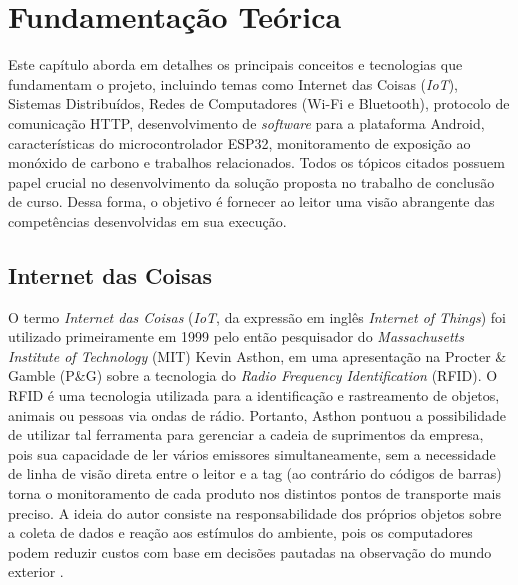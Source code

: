 \chapter{Fundamentação Teórica}

Este capítulo aborda em detalhes os principais conceitos e tecnologias que fundamentam o projeto, incluindo temas como Internet das Coisas (\textit{IoT}), Sistemas Distribuídos, 
Redes de Computadores (Wi-Fi e Bluetooth), protocolo de comunicação HTTP, desenvolvimento de \textit{software} para a plataforma Android, características do microcontrolador ESP32, monitoramento de 
exposição ao monóxido de carbono e trabalhos relacionados. Todos os tópicos citados possuem papel crucial no desenvolvimento da solução proposta no trabalho de conclusão de curso. Dessa forma, o
objetivo é fornecer ao leitor uma visão abrangente das competências desenvolvidas em sua execução.

\section{Internet das Coisas}

O termo \textit{Internet das Coisas} (\textit{IoT}, da expressão em inglês \textit{Internet of Things}) foi utilizado primeiramente em 1999 pelo então pesquisador do \textit{Massachusetts Institute of Technology} (MIT) Kevin Asthon, em 
uma apresentação na Procter \& Gamble (P\&G) sobre a tecnologia do \textit{Radio Frequency Identification} (RFID). O RFID é uma tecnologia utilizada para a identificação e rastreamento de objetos, animais ou pessoas 
via ondas de rádio. Portanto, Asthon pontuou a possibilidade de utilizar tal ferramenta para gerenciar a cadeia de suprimentos da empresa, pois sua capacidade de ler vários emissores simultaneamente, sem a necessidade de linha de visão direta entre o leitor 
e a tag (ao contrário do códigos de barras) torna o monitoramento de cada produto nos distintos pontos de transporte mais preciso. A ideia do autor consiste na responsabilidade dos próprios objetos sobre a coleta de dados
e reação aos estímulos do ambiente, pois os computadores podem reduzir custos com base em decisões pautadas na observação do mundo exterior \cite{iot-first-definition}.

